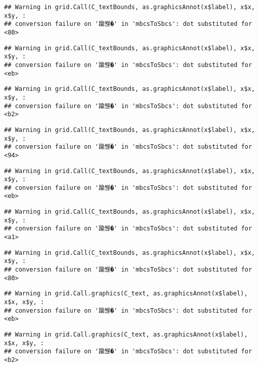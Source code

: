 \documentclass[
]{article}
\begin{document}
\begin{verbatim}
## Warning in grid.Call(C_textBounds, as.graphicsAnnot(x$label), x$x, x$y, :
## conversion failure on '踰붾�' in 'mbcsToSbcs': dot substituted for <80>
\end{verbatim}

\begin{verbatim}
## Warning in grid.Call(C_textBounds, as.graphicsAnnot(x$label), x$x, x$y, :
## conversion failure on '踰붾�' in 'mbcsToSbcs': dot substituted for <eb>
\end{verbatim}

\begin{verbatim}
## Warning in grid.Call(C_textBounds, as.graphicsAnnot(x$label), x$x, x$y, :
## conversion failure on '踰붾�' in 'mbcsToSbcs': dot substituted for <b2>
\end{verbatim}

\begin{verbatim}
## Warning in grid.Call(C_textBounds, as.graphicsAnnot(x$label), x$x, x$y, :
## conversion failure on '踰붾�' in 'mbcsToSbcs': dot substituted for <94>
\end{verbatim}

\begin{verbatim}
## Warning in grid.Call(C_textBounds, as.graphicsAnnot(x$label), x$x, x$y, :
## conversion failure on '踰붾�' in 'mbcsToSbcs': dot substituted for <eb>
\end{verbatim}

\begin{verbatim}
## Warning in grid.Call(C_textBounds, as.graphicsAnnot(x$label), x$x, x$y, :
## conversion failure on '踰붾�' in 'mbcsToSbcs': dot substituted for <a1>
\end{verbatim}

\begin{verbatim}
## Warning in grid.Call(C_textBounds, as.graphicsAnnot(x$label), x$x, x$y, :
## conversion failure on '踰붾�' in 'mbcsToSbcs': dot substituted for <80>
\end{verbatim}

\begin{verbatim}
## Warning in grid.Call.graphics(C_text, as.graphicsAnnot(x$label), x$x, x$y, :
## conversion failure on '踰붾�' in 'mbcsToSbcs': dot substituted for <eb>
\end{verbatim}

\begin{verbatim}
## Warning in grid.Call.graphics(C_text, as.graphicsAnnot(x$label), x$x, x$y, :
## conversion failure on '踰붾�' in 'mbcsToSbcs': dot substituted for <b2>
\end{verbatim}
\end{document}
